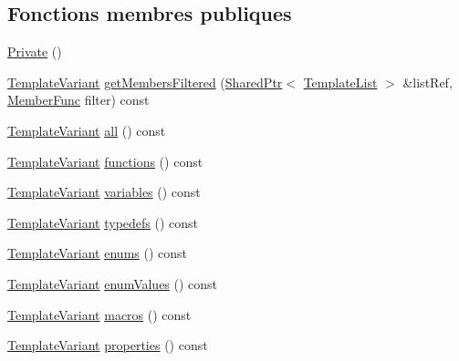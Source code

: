 \subsection*{Fonctions membres publiques}
\begin{DoxyCompactItemize}
\item 
\hyperlink{class_class_members_index_context_1_1_private_a11a6c50f3afb0aab78db67e9447871dd}{Private} ()
\item 
\hyperlink{class_template_variant}{Template\+Variant} \hyperlink{class_class_members_index_context_1_1_private_adb850b607b1c783d3253c0376a2d4723}{get\+Members\+Filtered} (\hyperlink{class_shared_ptr}{Shared\+Ptr}$<$ \hyperlink{class_template_list}{Template\+List} $>$ \&list\+Ref, \hyperlink{class_class_members_index_context_1_1_private_a8732304406adf01d0845051997d13762}{Member\+Func} filter) const 
\item 
\hyperlink{class_template_variant}{Template\+Variant} \hyperlink{class_class_members_index_context_1_1_private_a075006a24694eae49f8d1a3fbb83baac}{all} () const 
\item 
\hyperlink{class_template_variant}{Template\+Variant} \hyperlink{class_class_members_index_context_1_1_private_a3bce28b81e8a08c3f9a2979baf3e3042}{functions} () const 
\item 
\hyperlink{class_template_variant}{Template\+Variant} \hyperlink{class_class_members_index_context_1_1_private_a7be629549d2e64e0190971aebc893ac0}{variables} () const 
\item 
\hyperlink{class_template_variant}{Template\+Variant} \hyperlink{class_class_members_index_context_1_1_private_adae73acd83eb79c7b50f970076c84439}{typedefs} () const 
\item 
\hyperlink{class_template_variant}{Template\+Variant} \hyperlink{class_class_members_index_context_1_1_private_afef7e3da135761c58dcc8e4024be9bd7}{enums} () const 
\item 
\hyperlink{class_template_variant}{Template\+Variant} \hyperlink{class_class_members_index_context_1_1_private_adb363a4dcc5efac1a383b60369332898}{enum\+Values} () const 
\item 
\hyperlink{class_template_variant}{Template\+Variant} \hyperlink{class_class_members_index_context_1_1_private_af19cd2170a7c009605afdd87d76fe0e9}{macros} () const 
\item 
\hyperlink{class_template_variant}{Template\+Variant} \hyperlink{class_class_members_index_context_1_1_private_ab7d9bc9dfca9c943be3674330f2f3692}{properties} () const 
\item 

\end{DoxyCompactItemize}
